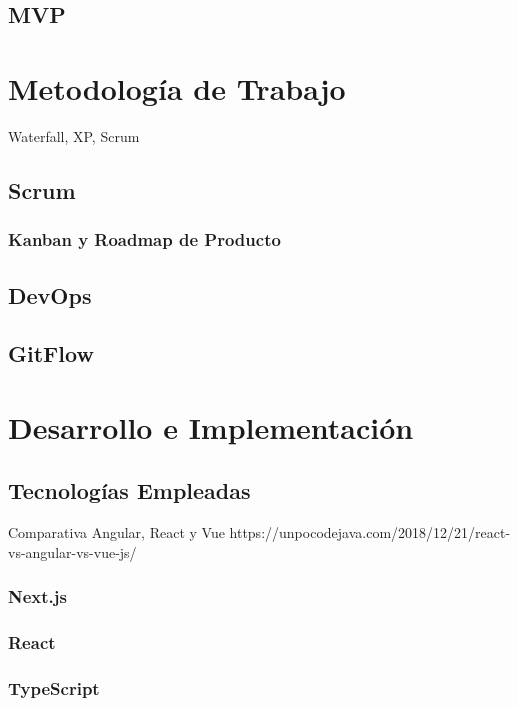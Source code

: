\documentclass[12pt,twoside,titlepage]{report}
\begin{document}
\subsection{MVP}


\section{Metodología de Trabajo}

Waterfall, XP, Scrum

\subsection{Scrum}

\subsubsection{Kanban y Roadmap de Producto}

\subsection{DevOps}

\subsection{GitFlow}

\section{Desarrollo e Implementación}

\subsection{Tecnologías Empleadas}

Comparativa Angular, React y Vue
https://unpocodejava.com/2018/12/21/react-vs-angular-vs-vue-js/

\subsubsection{Next.js}

\subsubsection{React}

\subsubsection{TypeScript}
\end{document}
